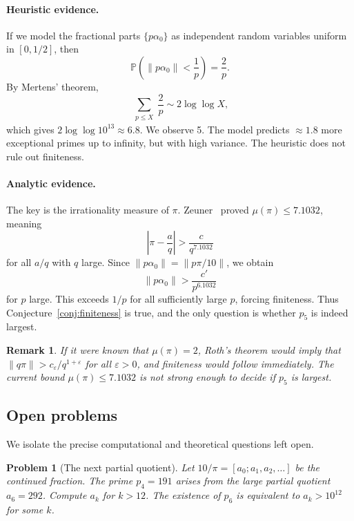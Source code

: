 \documentclass[12pt]{amsart}
\newtheorem{problem}[theorem]{Problem}
\newtheorem{remark}[theorem]{Remark}
\begin{document}
\paragraph{Heuristic evidence.} If we model the fractional parts $\{p\alpha_0\}$ as independent random variables uniform in $[0,1/2]$, then
\[
\mathbb{P}\left(\|p\alpha_0\| < \frac{1}{p}\right) = \frac{2}{p}.
\]
By Mertens' theorem,
\[
\sum_{\substack{p \le X}} \frac{2}{p} \sim 2\log\log X,
\]
which gives $2\log\log 10^{13} \approx 6.8$. We observe 5. The model predicts $\approx 1.8$ more exceptional primes up to infinity, but with high variance. The heuristic does not rule out finiteness.

\paragraph{Analytic evidence.} The key is the irrationality measure of $\pi$. Zeuner~\cite{zeuner2024} proved $\mu(\pi) \le 7.1032$, meaning
\[
\left|\pi - \frac{a}{q}\right| > \frac{c}{q^{7.1032}}
\]
for all $a/q$ with $q$ large. Since $\|p\alpha_0\| = \|p\pi/10\|$, we obtain
\[
\|p\alpha_0\| > \frac{c'}{p^{6.1032}}
\]
for $p$ large. This exceeds $1/p$ for all sufficiently large $p$, forcing finiteness. Thus Conjecture~\ref{conj:finiteness} is true, and the only question is whether $p_5$ is indeed largest.

\begin{remark}
If it were known that $\mu(\pi) = 2$, Roth's theorem would imply that $\|q\pi\| > c_\varepsilon/q^{1+\varepsilon}$ for all $\varepsilon > 0$, and finiteness would follow immediately. The current bound $\mu(\pi) \le 7.1032$ is not strong enough to decide if $p_5$ is largest.
\end{remark}

\subsection{Open problems}

We isolate the precise computational and theoretical questions left open.

\begin{problem}[The next partial quotient]
\label{prob:cf}
Let $10/\pi = [a_0; a_1, a_2, \dots]$ be the continued fraction. The prime $p_4 = 191$ arises from the large partial quotient $a_6 = 292$. Compute $a_k$ for $k > 12$. The existence of $p_6$ is equivalent to $a_k > 10^{12}$ for some $k$.
\end{problem}
\end{document}
